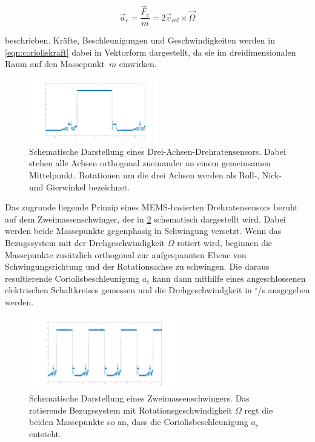 	\begin{equation}
		\vec{a}_c = \frac{\vec{F}_c}{m} = 2\vec{v}_{rel} \times \vec{\Omega}
		\label{eqn:corioliskraft}
	\end{equation}
 
 	beschrieben. Kräfte, Beschleunigungen und Geschwindigkeiten werden in \ref{eqn:corioliskraft} dabei in Vektorform dargestellt, da sie im dreidimensionalen Raum auf den Massepunkt~$m$ einwirken\cite{sensortechnik}.
 
 	\begin{figure}[h]
 		\centering
 		\includegraphics[width=0.5\textwidth]{images/rollpitchyaw.pdf}
 		\caption[Roll-, Nick- und Gierachsen]{Schematische Darstellung eines Drei-Achsen-Drehratensensors. Dabei stehen alle Achsen orthogonal zueinander an einem gemeinsamen Mittelpunkt.	Rotationen um die drei Achsen werden als Roll-, Nick- und Gierwinkel bezeichnet.}
 		\label{img:rollpitchyaw}
 	\end{figure}
 
 	Das zugrunde liegende Prinzip eines MEMS-basierten Drehratensensors beruht auf dem Zweimassenschwinger, der in \ref{img:zweimassenschwinger} schematisch dargestellt wird. Dabei werden beide Massepunkte gegenphasig in Schwingung versetzt. Wenn das Bezugssystem mit der Drehgeschwindigkeit $\Omega$ rotiert wird, beginnen die Massepunkte zusätzlich orthogonal zur aufgespannten Ebene von Schwingungsrichtung und der Rotationsachse zu schwingen. Die daraus resultierende Coriolisbeschleunigung $a_c$ kann dann mithilfe eines angeschlossenen elektrischen Schaltkreises gemessen und die Drehgeschwindgkeit in $^\circ$/s ausgegeben werden\cite{sensortechnik}.
 	
 	\begin{figure}[h]
 		\centering
 		\includegraphics[width=0.57\textwidth]{images/zweimassenschwinger.pdf}
 		\caption[Schematische Darstellung eines Zweimassenschwingers]{Schematische Darstellung eines Zweimassenschwingers. Das rotierende Bezugssystem mit Rotationsgeschwindigkeit $\Omega$ regt die beiden Massepunkte so an, dass die Coriolisbeschleunigung $a_c$ entsteht.}
 		\label{img:zweimassenschwinger}
 	\end{figure}
 
